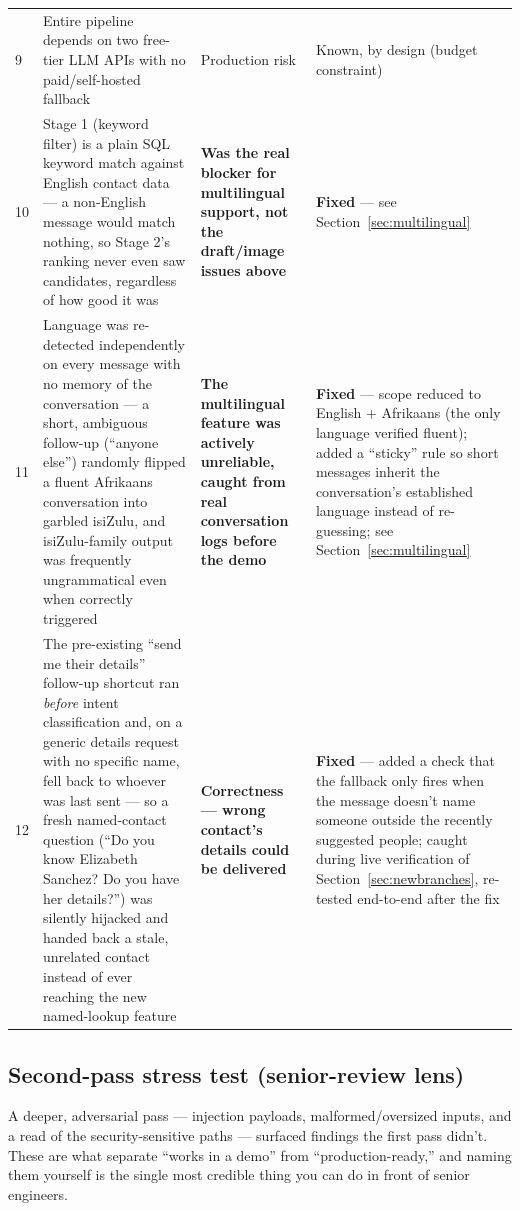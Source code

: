 \documentclass[11pt, a4paper]{article}
\newcommand{\good}[1]{\textcolor{good}{\textbf{#1}}}
\newcommand{\badc}[1]{\textcolor{bad}{\textbf{#1}}}
\begin{document}
\begin{longtable}{@{}p{0.3cm}p{6.5cm}p{2.8cm}p{3.5cm}@{}}
9 & Entire pipeline depends on two free-tier LLM APIs with no paid/self-hosted fallback & Production risk & Known, by design (budget constraint) \\
10 & Stage 1 (keyword filter) is a plain SQL keyword match against English contact data --- a non-English message would match nothing, so Stage 2's ranking never even saw candidates, regardless of how good it was & \badc{Was the real blocker for multilingual support, not the draft/image issues above} & \good{Fixed} --- see Section~\ref{sec:multilingual} \\
11 & Language was re-detected independently on every message with no memory of the conversation --- a short, ambiguous follow-up (``anyone else'') randomly flipped a fluent Afrikaans conversation into garbled isiZulu, and isiZulu-family output was frequently ungrammatical even when correctly triggered & \badc{The multilingual feature was actively unreliable, caught from real conversation logs before the demo} & \good{Fixed} --- scope reduced to English + Afrikaans (the only language verified fluent); added a ``sticky'' rule so short messages inherit the conversation's established language instead of re-guessing; see Section~\ref{sec:multilingual} \\
12 & The pre-existing ``send me their details'' follow-up shortcut ran \emph{before} intent classification and, on a generic details request with no specific name, fell back to whoever was last sent --- so a fresh named-contact question (``Do you know Elizabeth Sanchez? Do you have her details?'') was silently hijacked and handed back a stale, unrelated contact instead of ever reaching the new named-lookup feature & \badc{Correctness --- wrong contact's details could be delivered} & \good{Fixed} --- added a check that the fallback only fires when the message doesn't name someone outside the recently suggested people; caught during live verification of Section~\ref{sec:newbranches}, re-tested end-to-end after the fix \\
\bottomrule
\end{longtable}

\subsection{Second-pass stress test (senior-review lens)}
\label{sec:stress2}

A deeper, adversarial pass --- injection payloads, malformed/oversized inputs, and a read of the security-sensitive paths --- surfaced findings the first pass didn't. These are what separate ``works in a demo'' from ``production-ready,'' and naming them yourself is the single most credible thing you can do in front of senior engineers.
\end{document}
